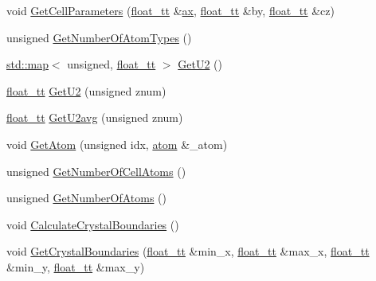 \begin{DoxyCompactItemize}
\item 
void \hyperlink{class_q_s_t_e_m_1_1_c_crystal_a049e1ae1af9ec426d8c0adb74d899d6c}{Get\-Cell\-Parameters} (\hyperlink{namespace_q_s_t_e_m_a915d7caa497280d9f927c4ce8d330e47}{float\-\_\-tt} \&\hyperlink{image_sim_8m_a8fa675eb2fcec5b95d9d21c670da7f30}{ax}, \hyperlink{namespace_q_s_t_e_m_a915d7caa497280d9f927c4ce8d330e47}{float\-\_\-tt} \&by, \hyperlink{namespace_q_s_t_e_m_a915d7caa497280d9f927c4ce8d330e47}{float\-\_\-tt} \&cz)
\item 
unsigned \hyperlink{class_q_s_t_e_m_1_1_c_crystal_ad529886d68b2e2a0d6c53e3da77ccdc9}{Get\-Number\-Of\-Atom\-Types} ()
\item 
\hyperlink{_displacement_params_8m_af619c74fd72bdb64d115463dff2720cd}{std\-::map}$<$ unsigned, \hyperlink{namespace_q_s_t_e_m_a915d7caa497280d9f927c4ce8d330e47}{float\-\_\-tt} $>$ \hyperlink{class_q_s_t_e_m_1_1_c_crystal_a074a18d1a850a160e9f294ad5b8a3f53}{Get\-U2} ()
\item 
\hyperlink{namespace_q_s_t_e_m_a915d7caa497280d9f927c4ce8d330e47}{float\-\_\-tt} \hyperlink{class_q_s_t_e_m_1_1_c_crystal_a27af020f2aee2ea28a0ede3a26b9aa21}{Get\-U2} (unsigned znum)
\item 
\hyperlink{namespace_q_s_t_e_m_a915d7caa497280d9f927c4ce8d330e47}{float\-\_\-tt} \hyperlink{class_q_s_t_e_m_1_1_c_crystal_a496164bd5c100d7ea5b82f9cf041c24c}{Get\-U2avg} (unsigned znum)
\item 
void \hyperlink{class_q_s_t_e_m_1_1_c_crystal_a7da8b27cabcd1cb6867fe1820267b0d0}{Get\-Atom} (unsigned idx, \hyperlink{namespace_q_s_t_e_m_a402dabc31a7a1fe906d0cdd138c69686}{atom} \&\-\_\-atom)
\item 
unsigned \hyperlink{class_q_s_t_e_m_1_1_c_crystal_ae11ea3f6cbfe89fa617db3f505deb5ff}{Get\-Number\-Of\-Cell\-Atoms} ()
\item 
unsigned \hyperlink{class_q_s_t_e_m_1_1_c_crystal_ae68e3a433f53ccdc7dbe698ff3d1b4e1}{Get\-Number\-Of\-Atoms} ()
\item 
void \hyperlink{class_q_s_t_e_m_1_1_c_crystal_a8c3e2f19089c2ba13731dcff96fda225}{Calculate\-Crystal\-Boundaries} ()
\item 
void \hyperlink{class_q_s_t_e_m_1_1_c_crystal_a181111221486d94181fd0089c282e737}{Get\-Crystal\-Boundaries} (\hyperlink{namespace_q_s_t_e_m_a915d7caa497280d9f927c4ce8d330e47}{float\-\_\-tt} \&min\-\_\-x, \hyperlink{namespace_q_s_t_e_m_a915d7caa497280d9f927c4ce8d330e47}{float\-\_\-tt} \&max\-\_\-x, \hyperlink{namespace_q_s_t_e_m_a915d7caa497280d9f927c4ce8d330e47}{float\-\_\-tt} \&min\-\_\-y, \hyperlink{namespace_q_s_t_e_m_a915d7caa497280d9f927c4ce8d330e47}{float\-\_\-tt} \&max\-\_\-y)
\end{DoxyCompactItemize}

